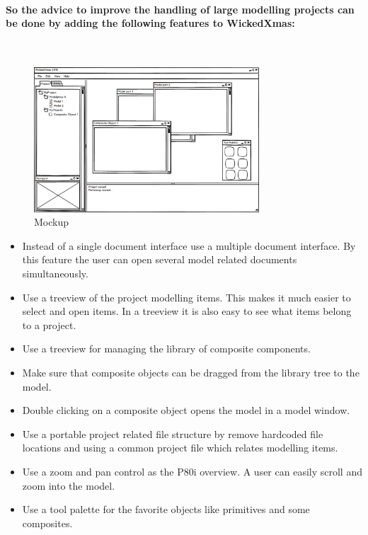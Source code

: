 \documentclass[a4paper,11pt,final]{article}
\begin{document}
\paragraph{So the advice to improve the handling of large modelling
projects can be done by adding the following features to WickedXmas:}\
\begin{figure}[here]
\center
\includegraphics[width=0.75\textwidth]{mockup.png}
\caption{Mockup}
\label{fig:mockup}
\end{figure}
\begin{itemize}
\item Instead of a single document interface use a multiple document interface. By this feature
the user can open several model related documents simultaneously.
\item Use a treeview of the project modelling items. This makes it much easier to select and open items.
In a treeview it is also easy to see what items belong to a project.
\item Use a treeview for managing the library of composite components.
\item Make sure that composite objects can be dragged from the library tree to the model.
\item Double clicking on a composite object opens the model in a model window.
\item Use a portable project related file structure by remove hardcoded file locations and using a common project file which relates modelling items.
\item Use a zoom and pan control as the P80i overview. A user can easily scroll and zoom into the model.
\item Use a tool palette for the favorite objects like primitives and some composites.
\end{itemize}



\newpage
\end{document}
